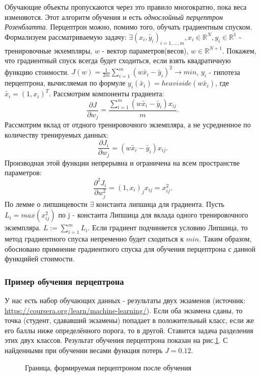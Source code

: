 \documentclass[../body.tex]{subfiles}
\begin{document}
Обучающие объекты пропускаются через это правило многократно, пока веса изменяются. Этот алгоритм обучения и есть \textit{однослойный перцептрон Розенблатта}.
Перцептрон можно, помимо того, обучать градиентным спуском. 
Формализуем рассматриваемую задачу: $\exists {(x_i, \widetilde{y_i})}_{i=1,...,m}, x_i \in \mathds{R}^N, y_i \in \mathds{R}^1$ - тренировочные экхемпляры, $w$ - вектор параметров(весов), $w \in \mathds{R}^{N+1}$.
Покажем, что градиентный спуск всегда будет сходиться, если взять квадратичную функцию стоимости.
$J(w) = \frac{1}{2m}\sum_{i=1}^m (w\widetilde{x_i} - \widetilde{y_i})^2 \rightarrow min$, $y_i$ - гипотеза перцептрона, вычисляемая по формуле $y_i(\widetilde{x_i}) = heaviside(w \widetilde{x_i})$, где $\widetilde{x_i} = (1, x_i)^T$.
Рассмотрим компоненты градиента: $$\frac{\partial J}{\partial w_j} = \frac{\sum_{i=1}^m (w\widetilde{x_i} - \widetilde{y_i})x_{ij}}{m}.$$
Рассмотрим вклад от отдного тренировочного экземпляра, а не усредненное по количеству тренируемых данных:
$$\frac{\partial J_i}{\partial w_j} = (w \widetilde{x_i} - \widetilde{y_i})x_{ij}.$$Производная этой функции непрерывна и ограничена на всем пространстве параметров: $$\frac{\partial^2 J_i}{\partial w_j^2} = (1, x_i)_j x_{ij} = x_{ij}^2.$$
По лемме о липшицевости \cite{lizorkin} $\exists$ константа липшица для градиента.
Пусть $L_i = max(x_{ij}^2)$ по j - константа Липшица для вклада одного тренировочного экземпляра. $L := \sum_{i=1}^m L_i$.
Если градиент подчиняется условию Липшица, то метод градиентного спуска непременно будет сходиться к $min$. 
Таким образом, обосновано примнение градиентного спуска для обучения перцептрона с данной функцийей стоимости.
 

\subsubsection{Пример обучения перцептрона}

У нас есть набор обучающих данных - результаты двух экзаменов (источник: \url{https://coursera.org/learn/machine-learning/}). Если оба экзамена сданы, то точка (студент, сдававший экзамены) попадает в положительный класс, если же его баллы ниже определённого порога, то в другой. Ставится задача разделения этих двух классов.
Результат обучения перцептрона показан на рис.\ref{perceptronOutput}. С найденными при обучении весами функция потерь $J = 0.12$.

\begin{figure}[H]
	\caption{Граница, формируемая перцептроном после обучения}
	\label{perceptronOutput}
\end{figure}
\end{document}

